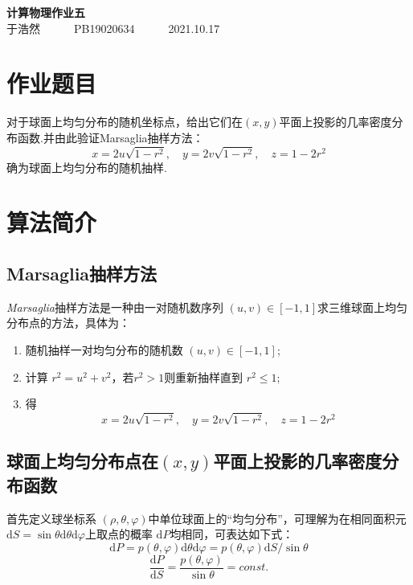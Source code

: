 \documentclass[12pt,a4paper,utf8]{ctexart}
\begin{document}
\begin{center}
    {\LARGE\textbf{计算物理作业五}}\\
    \textrm{于浩然}~~~~~~\textrm{PB19020634}~~~~~~\textrm{2021.10.17}
\end{center}

\section{作业题目}

对于球面上均匀分布的随机坐标点，给出它们在$(x,y)$平面上投影的几率密度分布函数.并由此验证Marsaglia抽样方法：
\begin{equation}
    x=2u \sqrt{1-r^2},\quad y=2v \sqrt{1-r^2}, \quad z=1-2r^2
\end{equation}
确为球面上均匀分布的随机抽样.

\section{算法简介}

\subsection{Marsaglia抽样方法}

\textsl{Marsaglia}抽样方法是一种由一对随机数序列 $(u,v) \in
[-1,1]$求三维球面上均匀分布点的方法，具体为：
\begin{enumerate}
    \item 随机抽样一对均匀分布的随机数 $(u,v) \in [-1,1]$;
    \item 计算 $r^2=u^2+v^2$，若$r^2 > 1 $则重新抽样直到 $r^2 \leq 1$;
    \item 得
        \begin{equation}
            x=2u \sqrt{1-r^2},\quad y=2v \sqrt{1-r^2}, \quad z=1-2r^2
        \end{equation}
\end{enumerate}  
\subsection{球面上均匀分布点在$(x,y)$平面上投影的几率密度分布函数}
首先定义球坐标系 $(\rho, \theta,
\varphi)$中单位球面上的“均匀分布”，可理解为在相同面积元 $
\textrm{d}S = \sin \theta \textrm{d} \theta \textrm{d} \varphi$上取点的概率 $ \textrm{d}P$均相同，可表达如下式：
\begin{equation}
    \textrm{d} P = p(\theta,\varphi) \textrm{d} \theta \textrm{d}
    \varphi = p(\theta,\varphi) \textrm{d}S / \sin \theta
\end{equation}
\begin{equation}
    \frac{ \textrm{d}P}{ \textrm{d}S} = \frac{p( \theta, \varphi)}{\sin \theta}
    = const.
\end{equation}
\end{document}
